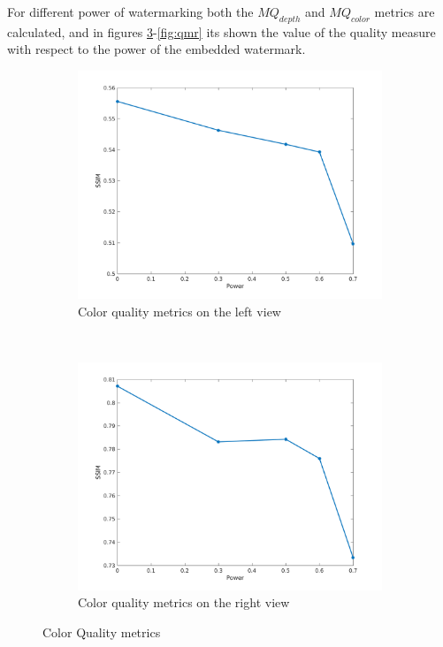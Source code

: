 For different power of watermarking both the $MQ_{depth}$ and $MQ_{color}$ metrics are calculated, and in figures \ref{fig:qml}-\ref{fig:qmr} its shown the value of the quality measure with respect to the power of the embedded watermark. 

\begin{figure}[h!]
    \centering
    \begin{subfigure}[t]{0.5\textwidth}
        \centering
\includegraphics[width=1\textwidth]{./img/qm_left.png}
          \caption{\small{Color quality metrics on the left view}}
\label{fig:qmcl}

    \end{subfigure}%
    ~ 
    \begin{subfigure}[t]{0.5\textwidth}
        \centering
\includegraphics[width=1\textwidth]{./img/qm_disp_left.png}
           \caption{\small{Color quality metrics on the right view}}
\label{fig:qmdl}
    \end{subfigure}
    \caption{Color Quality metrics}
    \label{fig:qml}
\end{figure}

